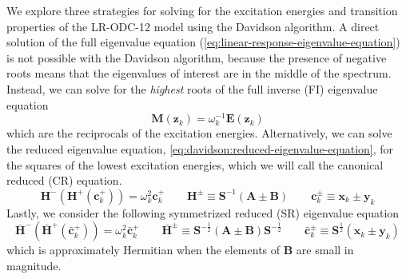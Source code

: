 We explore three strategies for solving for the excitation energies and
transition properties of the LR-ODC-12 model using the Davidson algorithm.
A direct solution of the full eigenvalue equation
(\cref{eq:linear-response-eigenvalue-equation}) is not possible with the
Davidson algorithm, because the presence of negative roots means that the
eigenvalues of interest are in the middle of the spectrum.
Instead, we can solve for the {\itshape highest} roots of the full inverse (FI)
eigenvalue equation
\begin{equation}
    \mathbf{M}(\mathbf{z}_k)
    =
    \omega_k^{-1}
    \mathbf{E}(\mathbf{z}_k)
\end{equation}
which are the reciprocals of the excitation energies.
Alternatively, we can solve the reduced eigenvalue equation,
\cref{eq:davidson:reduced-eigenvalue-equation}, for the squares of the lowest
excitation energies, which we will call the canonical reduced (CR) equation.
\begin{equation}
    \label{eq:davidson:canonical-reduced}
    \mathbf{H}^-(\mathbf{H}^+(\mathbf{c}_k^+))
    =
    \omega_k^2
    \mathbf{c}_k^+
    \qquad
    \mathbf{H}^{\pm}
    \equiv
    \mathbf{S}^{-1}
    (
        \mathbf{A} \pm \mathbf{B}
    )
    \qquad
    \mathbf{c}_k^{\pm}
    \equiv
    \mathbf{x}_k \pm \mathbf{y}_k
\end{equation}
Lastly, we consider the following symmetrized reduced (SR) eigenvalue equation
\begin{equation}
    \bar{\mathbf{H}}^-(\bar{\mathbf{H}}^+(\bar{\mathbf{c}}_k^+))
    =
    \omega_k^2
    \bar{\mathbf{c}}_k^+
    \qquad
    \bar{\mathbf{H}}^{\pm}
    \equiv
    \mathbf{S}^{-\frac{1}{2}}
    (
        \mathbf{A} \pm \mathbf{B}
    )
    \mathbf{S}^{-\frac{1}{2}}
    \qquad
    \bar{\mathbf{c}}_k^{\pm}
    \equiv
    \mathbf{S}^{\frac{1}{2}}
    (\mathbf{x}_k \pm \mathbf{y}_k)
\end{equation}
which is approximately Hermitian when the elements of
\(
    \mathbf{B}
\)
are small in magnitude.

